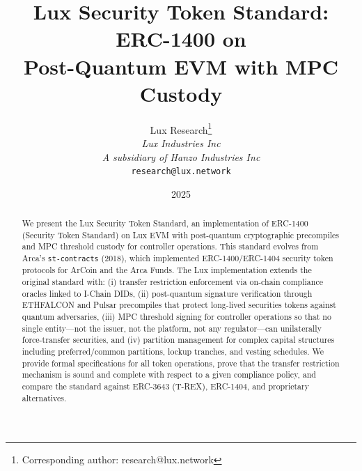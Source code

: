 \documentclass[11pt,a4paper]{article}
\title{Lux Security Token Standard: ERC-1400 on\\Post-Quantum EVM with MPC Custody}
\author{
Lux Research\thanks{Corresponding author: research@lux.network}\\
\textit{Lux Industries Inc}\\
\textit{A subsidiary of Hanzo Industries Inc}\\
\texttt{research@lux.network}
}
\date{2025}
\begin{document}
\luxcoverpage

\begin{abstract}
We present the Lux Security Token Standard, an implementation of ERC-1400 (Security Token Standard) on Lux EVM with post-quantum cryptographic precompiles and MPC threshold custody for controller operations. This standard evolves from Arca's \texttt{st-contracts} (2018), which implemented ERC-1400/ERC-1404 security token protocols for ArCoin and the Arca Funds. The Lux implementation extends the original standard with: (i) transfer restriction enforcement via on-chain compliance oracles linked to I-Chain DIDs, (ii) post-quantum signature verification through ETHFALCON and Pulsar precompiles that protect long-lived securities tokens against quantum adversaries, (iii) MPC threshold signing for controller operations so that no single entity---not the issuer, not the platform, not any regulator---can unilaterally force-transfer securities, and (iv) partition management for complex capital structures including preferred/common partitions, lockup tranches, and vesting schedules. We provide formal specifications for all token operations, prove that the transfer restriction mechanism is sound and complete with respect to a given compliance policy, and compare the standard against ERC-3643 (T-REX), ERC-1404, and proprietary alternatives.
\end{abstract}











\end{document}
